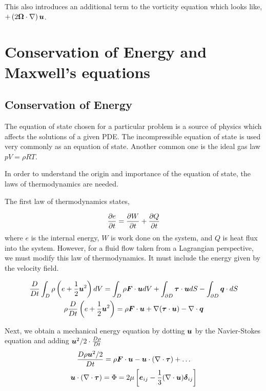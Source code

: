 \documentclass{article}
\begin{document}
This also introduces an additional term to the vorticity equation which looks
like, $+\left(2\boldsymbol{\Omega}\cdot\nabla\right)\boldsymbol{u}$. 


\section{Conservation of Energy and Maxwell's equations}

\subsection{Conservation of Energy}

The equation of state chosen for a particular problem is a source of physics
which affects the solutions of a given PDE. The incompressible equation of
state is used very commonly as an equation of state. Another common one is the
ideal gas law $pV = \rho RT$. 

In order to understand the origin and importance of the equation of state, the
laws of thermodynamics are needed. 

The first law of thermodynamics states, 

\begin{gather*}
    \frac{\partial e}{\partial t} = \frac{\partial W}{\partial t} + \frac{\partial Q}{\partial t}
\end{gather*}
where $e$ is the internal energy, $W$ is work done on the system, and $Q$ is
heat flux into the system. However, for a fluid flow taken from a Lagrangian
perspective, we must modify this law of thermodynamics. It must include the
energy given by the velocity field. 

\begin{gather*}
    \frac{D }{D t}\int_D \rho\left(e+\frac{1}{2}\boldsymbol{u}^2\right)dV = \int_D \rho
    \boldsymbol{F}\cdot\boldsymbol{u} dV + \int_{\partial D} \boldsymbol{\tau}\cdot\boldsymbol{u} dS - \int_{\partial
    D} \boldsymbol{q}\cdot dS \\
    \rho\frac{D }{D t}\left(e+\frac{1}{2}\boldsymbol{u}^2\right) = \rho\boldsymbol{F}\cdot\boldsymbol{u} +
    \nabla(\boldsymbol{\tau}\cdot\boldsymbol{u}) -
    \nabla\cdot\boldsymbol{q} 
\end{gather*}

Next, we obtain a mechanical energy equation by dotting $\boldsymbol{u}$ by the
Navier-Stokes equation and adding $\boldsymbol{u}^2/2 \cdot \frac{D \rho}{D t}$
\begin{gather*}
    \frac{D \rho\boldsymbol{u}^2/2}{D t} = \rho\boldsymbol{F}\cdot\boldsymbol{u} -
    \boldsymbol{u}\cdot\left(\nabla\cdot\boldsymbol{\tau}\right) + \ldots\\
    \boldsymbol{u}\cdot\left(\nabla\cdot\boldsymbol{\tau}\right) = 
    \Phi = 2\mu\left[\boldsymbol{e}_{ij} -
    \frac{1}{3}(\nabla\cdot\boldsymbol{u})\boldsymbol{\delta}_{ij}\right]
\end{gather*}
\end{document}
